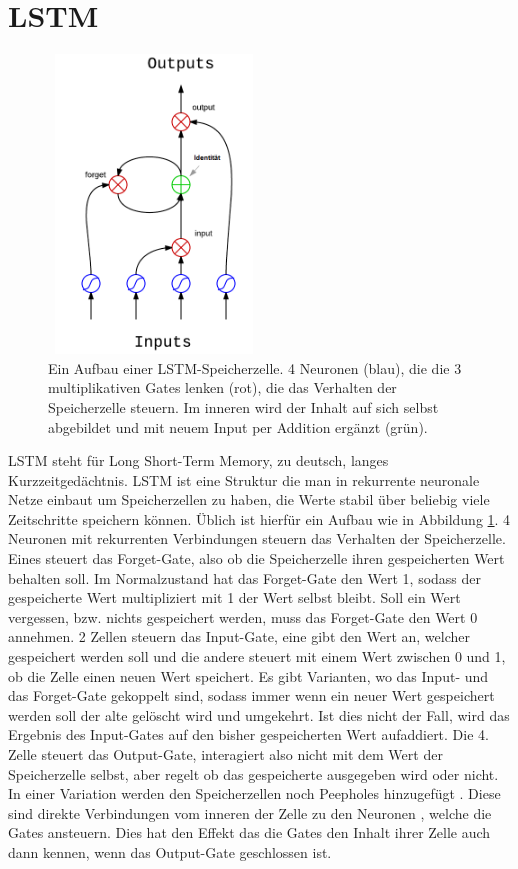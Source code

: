 \section{LSTM}
\begin{figure}
	\centering
	\includegraphics[width=0.5\textwidth, height=300px]{pics/lstm.png}	
	\caption{Ein Aufbau einer LSTM-Speicherzelle. 4 Neuronen (blau), die die 3 multiplikativen Gates lenken (rot), die das Verhalten der Speicherzelle steuern. Im inneren wird der Inhalt auf sich selbst abgebildet und mit neuem Input per Addition ergänzt (grün).    \cite{bib:lstmpic}}
	\label{img:lstm}
\end{figure}
LSTM steht für Long Short-Term Memory, zu deutsch, langes Kurzzeitgedächtnis. LSTM ist eine Struktur die man in rekurrente neuronale Netze einbaut um Speicherzellen zu haben, die Werte stabil über beliebig viele Zeitschritte speichern können. Üblich ist hierfür ein Aufbau wie in Abbildung \ref{img:lstm}. 4 Neuronen mit rekurrenten Verbindungen steuern das Verhalten der Speicherzelle. Eines steuert das Forget-Gate, also ob die Speicherzelle ihren gespeicherten Wert behalten soll. Im Normalzustand hat das Forget-Gate den Wert 1, sodass der gespeicherte Wert multipliziert mit 1 der Wert selbst bleibt. Soll ein Wert vergessen, bzw. nichts gespeichert werden, muss das Forget-Gate den Wert 0 annehmen. 2 Zellen steuern das Input-Gate, eine gibt den Wert an, welcher gespeichert werden soll und die andere steuert mit einem Wert zwischen 0 und 1, ob die Zelle einen neuen Wert speichert. Es gibt Varianten, wo das Input- und das Forget-Gate gekoppelt sind, sodass immer wenn ein neuer Wert gespeichert werden soll der alte gelöscht wird und umgekehrt\cite{bib:lstm3}. Ist dies nicht der Fall, wird das Ergebnis des Input-Gates auf den bisher gespeicherten Wert aufaddiert. Die 4. Zelle steuert das Output-Gate, interagiert also nicht mit dem Wert der Speicherzelle selbst, aber regelt ob das gespeicherte ausgegeben wird oder nicht. \cite{bib:lstm}
In einer Variation werden den Speicherzellen noch Peepholes hinzugefügt \cite{bib:peep}. Diese sind direkte Verbindungen vom inneren der Zelle zu den Neuronen , welche die Gates ansteuern. Dies hat den Effekt das die Gates den Inhalt ihrer Zelle auch dann kennen, wenn das Output-Gate geschlossen ist.  

